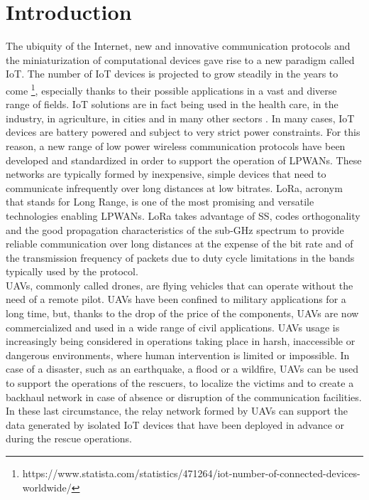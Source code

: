 
\chapter{Introduction}
\label{chapter:introduction}


The ubiquity of the Internet, new and innovative communication protocols and the miniaturization of computational devices gave rise to a new paradigm called \gls{IoT}. The number of \gls{IoT} devices is projected to grow steadily in the years to come \footnote{https://www.statista.com/statistics/471264/iot-number-of-connected-devices-worldwide/}, especially thanks to their possible applications in a vast and diverse range of fields. \gls{IoT} solutions are in fact being used in the health care, in the industry, in agriculture, in cities and in many other sectors \cite{ref:iot-apps}. In many cases, \gls{IoT} devices are battery powered and subject to very strict power constraints. For this reason, a new range of low power wireless communication protocols have been developed and standardized in order to support the operation of \glspl{LPWAN}. These networks are typically formed by inexpensive, simple devices that need to communicate infrequently over long distances at low bitrates. LoRa, acronym that stands for Long Range, is one of the most promising and versatile technologies enabling \glspl{LPWAN}. LoRa takes advantage of \gls{SS}, codes orthogonality and the good propagation characteristics of the sub-GHz spectrum to provide reliable communication over long distances at the expense of the bit rate and of the transmission frequency of packets due to duty cycle limitations in the bands typically used by the protocol. \\
\glspl{UAV}, commonly called drones, are flying vehicles that can operate without the need of a remote pilot. \glspl{UAV} have been confined to military applications for a long time, but, thanks to the drop of the price of the components, \glspl{UAV} are now commercialized and used in a wide range of civil applications. \glspl{UAV} usage is increasingly being considered in operations taking place in harsh, inaccessible or dangerous environments, where human intervention is limited or impossible. In case of a disaster, such as an earthquake, a flood or a wildfire, \glspl{UAV} can be used to support the operations of the rescuers, to localize the victims and to create a backhaul network in case of absence or disruption of the communication facilities. In these last circumstance, the relay network formed by \glspl{UAV} can support the data generated by isolated \gls{IoT} devices that have been deployed in advance or during the rescue operations. 

